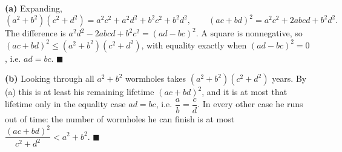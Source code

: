 \textbf{(a)} Expanding,
\[\left(a^2+b^2\right)\left(c^2+d^2\right)=a^2c^2+a^2d^2+b^2c^2+b^2d^2,\qquad(ac+bd)^2=a^2c^2+2abcd+b^2d^2.\]
The difference is $a^2d^2-2abcd+b^2c^2=(ad-bc)^2$. A square is nonnegative, so $(ac+bd)^2\le\left(a^2+b^2\right)\left(c^2+d^2\right)$, with equality exactly when $(ad-bc)^2=0$, i.e. $ad=bc$. $\blacksquare$

\textbf{(b)} Looking through all $a^2+b^2$ wormholes takes $\left(a^2+b^2\right)\left(c^2+d^2\right)$ years. By (a) this is at least his remaining lifetime $(ac+bd)^2$, and it is at most that lifetime only in the equality case $ad=bc$, i.e. $\dfrac ab=\dfrac cd$. In every other case he runs out of time: the number of wormholes he can finish is at most $\dfrac{(ac+bd)^2}{c^2+d^2}<a^2+b^2$. $\blacksquare$
